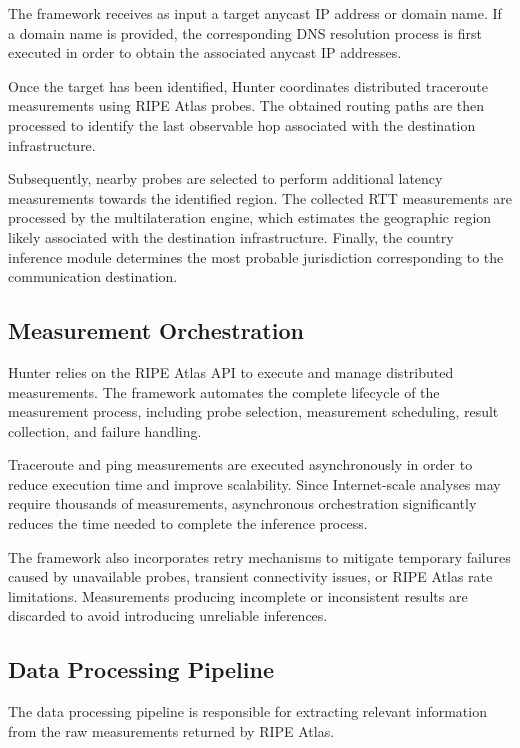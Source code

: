 The framework receives as input a target anycast IP address or domain name. If a domain name is provided, the corresponding DNS resolution process is first executed in order to obtain the associated anycast IP addresses.

Once the target has been identified, Hunter coordinates distributed traceroute measurements using RIPE Atlas probes. The obtained routing paths are then processed to identify the last observable hop associated with the destination infrastructure.

Subsequently, nearby probes are selected to perform additional latency measurements towards the identified region. The collected RTT measurements are processed by the multilateration engine, which estimates the geographic region likely associated with the destination infrastructure. Finally, the country inference module determines the most probable jurisdiction corresponding to the communication destination.

\subsection{Measurement Orchestration}

Hunter relies on the RIPE Atlas API to execute and manage distributed measurements. The framework automates the complete lifecycle of the measurement process, including probe selection, measurement scheduling, result collection, and failure handling.

Traceroute and ping measurements are executed asynchronously in order to reduce execution time and improve scalability. Since Internet-scale analyses may require thousands of measurements, asynchronous orchestration significantly reduces the time needed to complete the inference process.

The framework also incorporates retry mechanisms to mitigate temporary failures caused by unavailable probes, transient connectivity issues, or RIPE Atlas rate limitations. Measurements producing incomplete or inconsistent results are discarded to avoid introducing unreliable inferences.

\subsection{Data Processing Pipeline}

The data processing pipeline is responsible for extracting relevant information from the raw measurements returned by RIPE Atlas.

